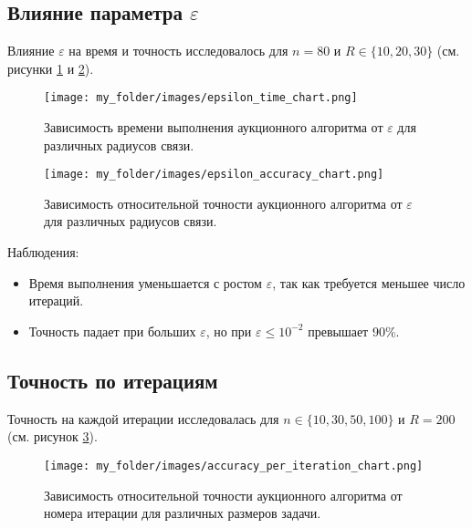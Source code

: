 \subsection{Влияние параметра \( \varepsilon \)}

\vspace{0.3cm}

Влияние \( \varepsilon \) на время и точность исследовалось для \( n = 80 \) и \( R \in \{10, 20, 30\} \) (см. рисунки \ref{fig:epsilon_time_chart} и \ref{fig:epsilon_accuracy_chart}).

\begin{figure}[h]
    \centering
    \texttt{[image: my\_folder/images/epsilon\_time\_chart.png]}
    \caption{Зависимость времени выполнения аукционного алгоритма от \( \varepsilon \) для различных радиусов связи.}
    \label{fig:epsilon_time_chart}
\end{figure}

\begin{figure}[h]
    \centering
    \texttt{[image: my\_folder/images/epsilon\_accuracy\_chart.png]}
    \caption{Зависимость относительной точности аукционного алгоритма от \( \varepsilon \) для различных радиусов связи.}
    \label{fig:epsilon_accuracy_chart}
\end{figure}

Наблюдения:
\begin{itemize}
    \item Время выполнения уменьшается с ростом \( \varepsilon \), так как требуется меньшее число итераций.
    \item Точность падает при больших \( \varepsilon \), но при \( \varepsilon \leq 10^{-2} \) превышает 90\%.
\end{itemize}

\subsection{Точность по итерациям}

\vspace{0.3cm}

Точность на каждой итерации исследовалась для \( n \in \{10, 30, 50, 100\} \) и \( R = 200 \) (см. рисунок \ref{fig:acc_per_iteration_chart}).

\begin{figure}[h]
    \centering
    \texttt{[image: my\_folder/images/accuracy\_per\_iteration\_chart.png]}
    \caption{Зависимость относительной точности аукционного алгоритма от номера итерации для различных размеров задачи.}
    \label{fig:acc_per_iteration_chart}
\end{figure}

